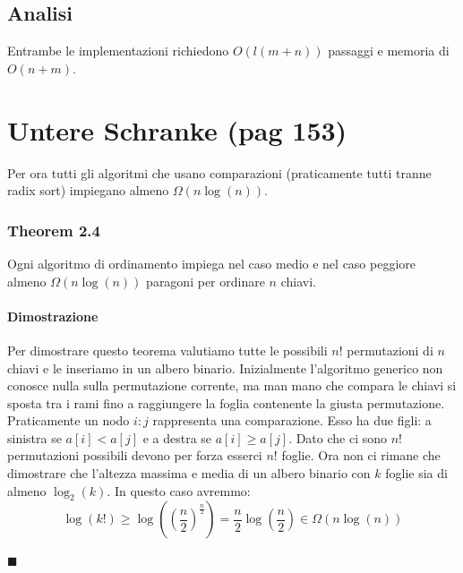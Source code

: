 \documentclass[a4paper]{book}
\newenvironment{mytheorem}[1]{\subsubsection*{Theorem #1}}{\begin{flushright}$\blacksquare$\end{flushright}}
\begin{document}
\subsection*{Analisi}
Entrambe le implementazioni richiedono $O(l(m+n))$ passaggi e memoria di $O(n+m)$.
\section{Untere Schranke (pag 153)}
Per ora tutti gli algoritmi che usano comparazioni (praticamente tutti tranne radix sort) impiegano almeno $\Omega (n \log (n))$. 
\begin{mytheorem}{2.4}
Ogni algoritmo di ordinamento impiega nel caso medio e nel caso peggiore almeno $\Omega (n \log (n))$ paragoni per ordinare $n$ chiavi.
\paragraph*{Dimostrazione}
Per dimostrare questo teorema valutiamo tutte le possibili $n!$ permutazioni di $n$ chiavi e le inseriamo in un albero binario. Inizialmente l'algoritmo generico non conosce nulla sulla permutazione corrente, ma man mano che compara le chiavi si sposta tra i rami fino a raggiungere la foglia contenente la giusta permutazione. Praticamente un nodo $i:j$ rappresenta una comparazione. Esso ha due figli: a sinistra se $a[i]<a[j]$ e a destra se $a[i] \geq a[j]$. Dato che ci sono $n!$ permutazioni possibili devono per forza esserci $n!$ foglie. Ora non ci rimane che dimostrare che l'altezza massima e media di un albero binario con $k$ foglie sia di almeno $\log_2 (k)$. In questo caso avremmo:
$$ \log (k!) \geq \log \left(\left(\frac{n}{2}\right)^{\frac{n}{2}}\right) = \frac{n}{2} \log \left(\frac{n}{2}\right) \in \Omega (n \log (n))$$
\end{mytheorem}
\end{document}
